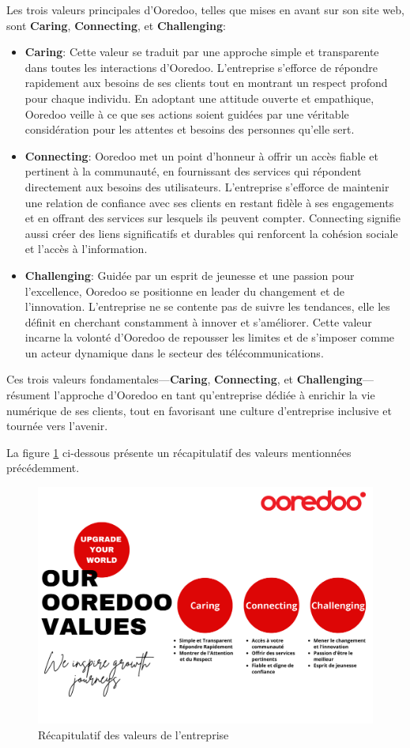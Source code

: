Les trois valeurs principales d'Ooredoo, telles que mises en avant sur son site web, sont \textbf{Caring}, \textbf{Connecting}, et \textbf{Challenging}:
\begin{itemize}
    \item \textbf{Caring}: Cette valeur se traduit par une approche simple et transparente dans toutes les interactions d'Ooredoo. L'entreprise s'efforce de répondre rapidement aux besoins de ses clients tout en montrant un respect profond pour chaque individu. En adoptant une attitude ouverte et empathique, Ooredoo veille à ce que ses actions soient guidées par une véritable considération pour les attentes et besoins des personnes qu'elle sert.    
    \item \textbf{Connecting}: Ooredoo met un point d'honneur à offrir un accès fiable et pertinent à la communauté, en fournissant des services qui répondent directement aux besoins des utilisateurs. L'entreprise s'efforce de maintenir une relation de confiance avec ses clients en restant fidèle à ses engagements et en offrant des services sur lesquels ils peuvent compter. Connecting signifie aussi créer des liens significatifs et durables qui renforcent la cohésion sociale et l'accès à l'information.
    \item \textbf{Challenging}: Guidée par un esprit de jeunesse et une passion pour l'excellence, Ooredoo se positionne en leader du changement et de l'innovation. L'entreprise ne se contente pas de suivre les tendances, elle les définit en cherchant constamment à innover et s'améliorer. Cette valeur incarne la volonté d'Ooredoo de repousser les limites et de s'imposer comme un acteur dynamique dans le secteur des télécommunications.
\end{itemize}

Ces trois valeurs fondamentales—\textbf{Caring}, \textbf{Connecting}, et \textbf{Challenging}—résument l'approche d'Ooredoo en tant qu'entreprise dédiée à enrichir la vie numérique de ses clients, tout en favorisant une culture d'entreprise inclusive et tournée vers l'avenir.

La figure \ref{valeurs} ci-dessous présente un récapitulatif des valeurs mentionnées précédemment.

\begin{figure}[H]
    \centering
    \includegraphics[width=0.6\linewidth]{Value_Ooredoo.png}
    \caption{Récapitulatif des valeurs de l’entreprise}
    \label{valeurs}
\end{figure}

